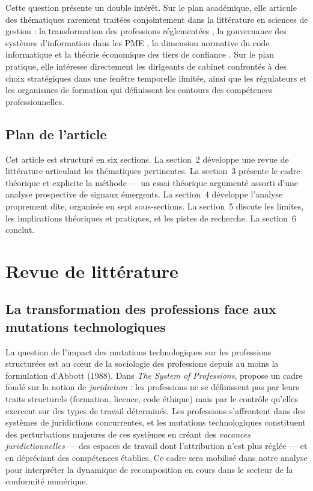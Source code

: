 \documentclass[12pt,a4paper]{article}
\begin{document}
Cette question présente un double intérêt. Sur le plan académique, elle articule des thématiques rarement traitées conjointement dans la littérature en sciences de gestion : la transformation des professions réglementées \parencite{abbott1988, susskind2015}, la gouvernance des systèmes d'information dans les PME \parencite{reix2011}, la dimension normative du code informatique \parencite{lessig1999, zittrain2008} et la théorie économique des tiers de confiance \parencite{akerlof1970, williamson1985}. Sur le plan pratique, elle intéresse directement les dirigeants de cabinet confrontés à des choix stratégiques dans une fenêtre temporelle limitée, ainsi que les régulateurs et les organismes de formation qui définissent les contours des compétences professionnelles.

\subsection*{Plan de l'article}

Cet article est structuré en six sections. La section~2 développe une revue de littérature articulant les thématiques pertinentes. La section~3 présente le cadre théorique et explicite la méthode — un essai théorique argumenté assorti d'une analyse prospective de signaux émergents. La section~4 développe l'analyse proprement dite, organisée en sept sous-sections. La section~5 discute les limites, les implications théoriques et pratiques, et les pistes de recherche. La section~6 conclut.

\section{Revue de littérature}

\subsection{La transformation des professions face aux mutations technologiques}

La question de l'impact des mutations technologiques sur les professions structurées est au cœur de la sociologie des professions depuis au moins la formulation d'Abbott (1988). Dans \emph{The System of Professions}, \textcite{abbott1988} propose un cadre fondé sur la notion de \emph{juridiction} : les professions ne se définissent pas par leurs traits structurels (formation, licence, code éthique) mais par le contrôle qu'elles exercent sur des types de travail déterminés. Les professions s'affrontent dans des systèmes de juridictions concurrentes, et les mutations technologiques constituent des perturbations majeures de ces systèmes en créant des \emph{vacances juridictionnelles} — des espaces de travail dont l'attribution n'est plus réglée — et en dépréciant des compétences établies. Ce cadre sera mobilisé dans notre analyse pour interpréter la dynamique de recomposition en cours dans le secteur de la conformité numérique.
\end{document}
